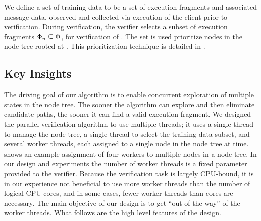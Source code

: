 We define a set of training data \trainingFrags{} to be a set of
execution fragments and associated message data, observed and
collected via execution of the client prior to verification.
During verification, the verifier selects a subset of execution
fragments $\Phi_{n} \subseteq \Phi_{}$, for
verification of \msg{\msgNmbr}. The set \trainingFrags{\msgNmbr} is
used prioritize nodes in the node tree rooted at
. This prioritization technique is detailed in
.

\subsection{Key Insights}
The driving goal of our algorithm is to enable concurrent exploration
of multiple states in the node tree. The sooner the algorithm can
explore and then eliminate candidate paths, the sooner it can find a
valid execution fragment. We designed the parallel verification
algorithm to use multiple threads; it uses a single thread to manage
the node tree, a single thread to select the training data subset, and
several worker threads, each assigned to a single node in the node
tree at time.  shows an example
assignment of four workers to multiple nodes in a node tree. In our
design and experiments the number of worker threads \workerCount is a
fixed parameter provided to the verifier. Because the verification
task is largely CPU-bound, it is in our experience not beneficial to
use more worker threads than the number of logical CPU cores, and in
some cases, fewer worker threads than cores are necessary. The main
objective of our design is to get ``out of the way'' of the worker
threads. What follows are the high level features of the design.

